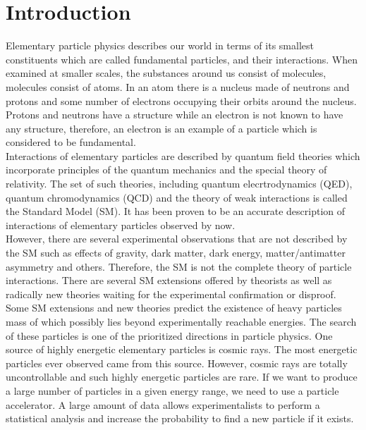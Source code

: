 \section{Introduction}
\label{sec:intro}

Elementary particle physics describes our world in terms of its smallest constituents which are called fundamental particles, and their interactions. When examined at smaller scales, the substances around us consist of molecules, molecules consist of atoms. In an atom there is a nucleus made of neutrons and protons and some number of electrons occupying their orbits around the nucleus. Protons and neutrons have a structure while an electron is not known to have any structure, therefore, an electron is an example of a particle which is considered to be fundamental.\\

Interactions of elementary particles are described by quantum field theories which incorporate principles of the quantum mechanics and the special theory of relativity. The set of such theories, including quantum elecrtrodynamics (QED), quantum chromodynamics (QCD) and the theory of weak interactions is called the Standard Model (SM). It has been proven to be an accurate description of interactions of elementary particles observed by now.\\ 

However, there are several experimental observations that are not described by the SM such as effects of gravity, dark matter, dark energy, matter/antimatter asymmetry and others. Therefore, the SM is not the complete theory of particle interactions. There are several SM extensions offered by theorists as well as radically new theories waiting for the experimental confirmation or disproof. \\

Some SM extensions and new theories predict the existence of heavy particles mass of which possibly lies beyond experimentally reachable energies. The search of these particles is one of the prioritized directions in particle physics. One source of highly energetic elementary particles is cosmic rays. The most energetic particles ever observed came from this source. However, cosmic rays are totally uncontrollable and such highly energetic particles are rare. If we want to produce a large number of particles in a given energy range, we need to use a particle accelerator. A large amount of data allows experimentalists to perform a statistical analysis and increase the probability to find a new particle if it exists.\\

